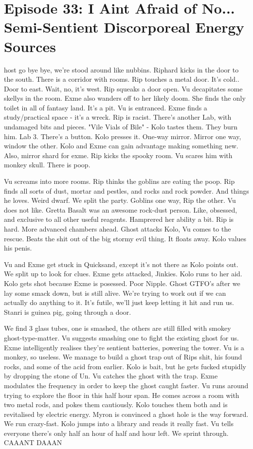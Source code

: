 \section{Episode 33: I Aint Afraid of No... Semi-Sentient Discorporeal Energy Sources}

\begin{multicols}{2}

host go bye bye, we’re stood around like nubbins. Riphard kicks in the door to the south. There is a corridor with rooms. Rip touches a metal door. It’s cold.. Door to east. Wait, no, it’s west. Rip squeaks a door open. Vu decapitates some skellys in the room. Exme also wanders off to her likely doom. She finds the only toilet in all of fantasy land. It’s a pit. Vu is entranced. Exme finds a study/practical space - it’s a wreck. Rip is racist. There’s another Lab, with undamaged bits and pieces. "Vile Vials of Bile" - Kolo tastes them. They burn him. Lab 3. There’s a button. Kolo presses it. One-way mirror. Mirror one way, window the other. Kolo and Exme can gain advantage making something new. Also, mirror shard for exme. Rip kicks the spooky room. Vu scares him with monkey skull. There is poop.\medskip

Vu screams into more rooms. Rip thinks the goblins are eating the poop. Rip finds all sorts of dust, mortar and pestles, and rocks and rock powder. And things he loves. Weird dwarf. We split the party. Goblins one way, Rip the other. Vu does not like. Gretta Basalt was an awesome rock-dust person. Like, obsessed, and exclusive to all other useful reagents. Hamprered her ability a bit. Rip is hard. More advanced chambers ahead. Ghost attacks Kolo, Vu comes to the rescue. Beats the shit out of the big stormy evil thing. It floats away. Kolo values his penis.\medskip

Vu and Exme get stuck in Quicksand, except it’s not there as Kolo points out. We split up to look for clues. Exme gets attacked, Jinkies. Kolo runs to her aid. Kolo gets shot because Exme is posessed. Poor Nipple. Ghost GTFO’s after we lay some smack down, but is still alive. We’re trying to work out if we can actually do anything to it. It’s futile, we’ll just keep letting it hit and run us. Stanri is guinea pig, going through a door.\medskip

We find 3 glass tubes, one is smashed, the others are still filled with smokey ghost-type-matter. Vu suggests smashing one to fight the existing ghost for us. Exme intelligently realises they’re sentient batteries, powering the tower. Vu is a monkey, so useless. We manage to build a ghost trap out of Rips shit, his found rocks, and some of the acid from earlier. Kolo is bait, but he gets fucked stupidly by dropping the stone of Un. Vu catches the ghost with the trap. Exme modulates the frequency in order to keep the ghost caught faster. Vu runs around trying to explore the floor in this half hour span. He comes across a room with two metal rods, and pokes them cautiously. Kolo touches them both and is revitalised by electric energy. Myron is convinced a ghost hole is the way forward. We run crazy-fast. Kolo jumps into a library and reads it really fast. Vu tells everyone there’s only half an hour of half and hour left. We sprint through. CAAANT DAAAN\medskip


\end{multicols}
